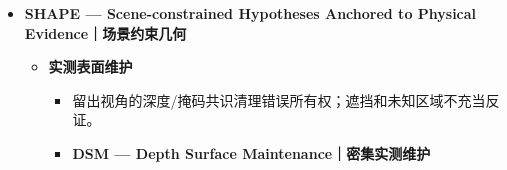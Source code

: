 \documentclass[UTF8,fontset=fandol]{ctexart}
\begin{document}
\begin{itemize}
\begin{itemize}
\begin{itemize}
\begin{itemize}
\item 原图像素、相机基线和三帧逐点验证共同准入，已拥有表面抑制重复根。

\end{itemize}

\item \textbf{RSE — Robust Surface Envelopes｜稳健表面包络}


\begin{itemize}
\item 已确认表面取回重复点，未知余量保留；不设定固定两排或物体数量。


\item FAST-MCD、主平面及实测连通分量审核稀疏污染，证据不足撤销修正。

\end{itemize}

\item \textbf{HMG — Hierarchical Mask Guard｜整体掩码保护}


\begin{itemize}
\item 候选拒绝前核验原生重叠掩码、深度可见性和相机基线；整体不因部件占据互斥像素而消失。


\item 图像身份仍须胜过背景/结构反证；未知点保留，重复反证点才移除。

\end{itemize}

\item 保留可靠分离证据；候选验收、冲突身份及背景/台面反证决定最终独立物体。


\item GPT比较流程新增可见归属竞争、局部地板反证与唯一完整物体锚定；同一实测面不重复计数，精细实例受保护。

\end{itemize}
\end{itemize}

\item \textbf{SHAPE — Scene-constrained Hypotheses Anchored to Physical Evidence｜场景约束几何}


\begin{itemize}
\item \textbf{实测表面维护}


\begin{itemize}
\item 留出视角的深度/掩码共识清理错误所有权；遮挡和未知区域不充当反证。


\item \textbf{DSM — Depth Surface Maintenance｜密集实测维护}



\end{itemize}
\end{itemize}
\end{itemize}
\end{document}
